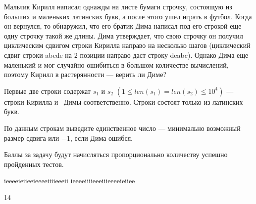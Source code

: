 
Мальчик Кирилл написал однажды на листе бумаги строчку, состоящую из больших и маленьких 
латинских букв, а после этого ушел играть в футбол. Когда он вернулся, то обнаружил, 
что его братик Дима написал под его строкой еще одну строчку такой же длины. 
Дима утверждает, что свою строчку он получил циклическим сдвигом строки Кирилла 
направо на несколько шагов (циклический сдвиг строки abcde на 2 позиции направо 
даст строку deabc). Однако Дима еще маленький и мог случайно ошибиться в большом 
количестве вычислений, поэтому Кирилл в растерянности — верить ли Диме?

Первые две строки содержат $s_1$ и $s_2$ $(1\leq len(s_1) = len(s_2) \leq 10^4)$ — строки Кирилла и \
Димы соответственно. Строки состоят только из латинских букв.

\outputfmtSection
По данным строкам выведите единственное число — минимально возможный размер сдвига или $ -1 $, если Дима ошибся.

\markSection

Баллы за задачу будут начисляться пропорционально количеству успешно пройденных тестов.


\begin{myverbbox}[\small]{\vinput}
    ieeeeieiieeieeeeiiiieeeii
    ieeeeiiiieeeiiieeeeieiiee
\end{myverbbox}

\begin{myverbbox}[\small]{\voutput}
    14
\end{myverbbox}

